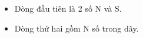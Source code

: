 \begin{itemize}
	\item     Dòng đầu tiên là 2 số N và S.   
	\item     Dòng thứ hai gồm N số trong dãy.   
\end{itemize}